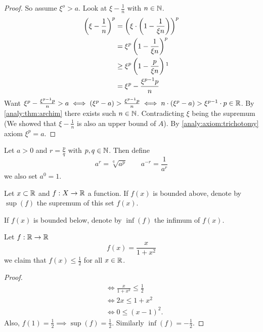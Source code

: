 \documentclass[10pt, a4paper]{article}
\begin{document}
\begin{theorem}
\begin{proof}
        So assume $\xi ^ o > a$.
        Look at $\xi - \frac{1}{n}$ with $n \in \mathbb{N}$.
        \begin{align*}
            \left(\xi - \frac{1}{n}\right) ^ p &= \left(\xi \cdot\left(1 - \frac{1}{\xi n}\right)\right) ^ p \\
            &= \xi ^ p \left(1 - \frac{1}{\xi n}\right) ^ p \\
            &\geq \xi ^ p \left(1 - \frac{p}{\xi n}\right)\footnotemark \\
            &= \xi ^ p - \frac{\xi ^ {p - 1}p}{n}
        \end{align*}
        Want $\xi ^ p - \frac{\xi ^ {p - 1}p}{n} > a \iff (\xi ^ p - a) > \frac{\xi ^ {p - 1}p}{n} \iff n \cdot (\xi ^ p - a) > \xi ^ {p - 1} \cdot p \in \mathbb{R}$.
        By \autoref{analy:thm:archim} there exists such $n \in \mathbb{N}$.
        Contradicting $\xi$ being the supremum (We showed that $\xi - \frac{1}{n}$ is also an upper bound of $A$).
        By \autoref{analy:axiom:trichotomy} axiom $\xi ^ p = a$.
        \end{proof}
\end{theorem}

\begin{definition}
    Let $a > 0$ and $r = \frac{p}{q}$ with $p, q \in \mathbb{N}$. Then define
    \[
    a ^ r = \sqrt[q]{a ^ p}\qquad a ^ {-r} = \frac{1}{a ^ r}
    \]
    we also set $a ^ 0 = 1$.
\end{definition}

\begin{definition}
    Let $x \subset \mathbb{R}$ and $f : X \to \mathbb{R}$ a function.
    If $f(x)$ is bounded above,
    denote by $\sup(f)$ the supremum of this set $f(x)$.

    If $f(x)$ is bounded below,
    denote by $\inf(f)$ the infimum of $f(x)$.
\end{definition}

\begin{example}
    Let $f : \mathbb{R} \to \mathbb{R}$
    \[
    f(x) = \frac{x}{1 + x ^ 2}
    \]
    we claim that $f(x) \leq \frac{1}{2}$ for all $x \in \mathbb{R}$.
    \begin{proof}
        \begin{align*}
            &\iff \frac{x}{1 + x ^ 2} \leq \frac{1}{2} \\
            &\iff 2x \leq 1 + x ^ 2 \\
            &\iff  0 \leq (x - 1) ^ 2.
        \end{align*}
        Also, $f(1) = \frac{1}{2} \implies \sup(f) = \frac{1}{2}$.
        Similarly $\inf(f) = -\frac{1}{2}$.
    \end{proof}
\end{example}
\end{document}
